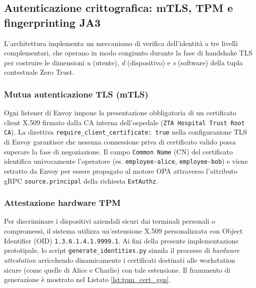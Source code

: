 \subsection{Autenticazione crittografica: mTLS, TPM e fingerprinting JA3}
L'architettura implementa un meccanismo di verifica dell'identità a tre livelli complementari, che operano in modo congiunto durante la fase di handshake TLS per costruire le dimensioni \textit{u} (utente), \textit{d} (dispositivo) e \textit{s} (software) della tupla contestuale Zero Trust.

\subsubsection{Mutua autenticazione TLS (mTLS)}
Ogni listener di Envoy impone la presentazione obbligatoria di un certificato client X.509 firmato dalla CA interna dell'ospedale (\texttt{ZTA Hospital Trust Root CA}). La direttiva \texttt{require\_client\_certificate: true} nella configurazione TLS di Envoy garantisce che nessuna connessione priva di certificato valido possa superare la fase di negoziazione. Il campo \texttt{Common Name} (CN) del certificato identifica univocamente l'operatore (es. \texttt{employee-alice}, \texttt{employee-bob}) e viene estratto da Envoy per essere propagato al motore OPA attraverso l'attributo gRPC \texttt{source.principal} della richiesta \texttt{ExtAuthz}.

\subsubsection{Attestazione hardware TPM}
Per discriminare i dispositivi aziendali sicuri dai terminali personali o compromessi, il sistema utilizza un'estensione X.509 personalizzata con Object Identifier (OID) \texttt{1.3.6.1.4.1.9999.1}. Ai fini della presente implementazione prototipale, lo script \texttt{generate\_identities.py} simula il processo di \textit{hardware attestation} arricchendo dinamicamente i certificati destinati alle workstation sicure (come quelle di Alice e Charlie) con tale estensione. Il frammento di generazione è mostrato nel Listato \ref{lst:tpm_cert_gen}.


